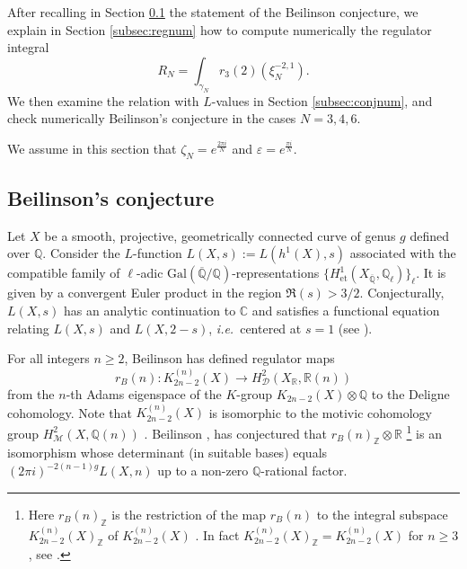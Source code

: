 \documentclass[11pt,a4,leqno]{amsart}
\theoremstyle{my theoremstyle}
\theoremstyle{dfn}
\theoremstyle{remark}
\renewcommand{\1}{\mathbbm{1}}
\newcommand{\Z}{\mathbb{Z}}
\newcommand{\Q}{\mathbb{Q}}
\newcommand{\R}{\mathbb{R}}
\newcommand{\C}{\mathbb{C}}
\newcommand{\e}{\varepsilon}
\newcommand{\z}{\zeta}
\numberwithin{equation}{section}
\begin{document}
After recalling in Section \ref{subsec:beilinson} the statement of the Beilinson conjecture, we explain in Section \ref{subsec:regnum} how to compute numerically the regulator integral
\begin{equation*}
    R_N = \int_{\gamma_N} r_3(2)(\xi_N^{-2,1}).
\end{equation*}
We then examine the relation with $L$-values in Section \ref{subsec:conjnum}, and check numerically Beilinson's conjecture in the cases $N=3,4,6$.

We assume in this section that $\z_N=e^{\frac{2\pi i}{N}}$ and $\e=e^{\frac{\pi i}{N}}$.

\subsection{Beilinson's conjecture} \label{subsec:beilinson}

Let $X$ be a smooth, projective, geometrically connected curve of genus $g$ defined over $\Q$. Consider the $L$-function $L(X,s):=L(h^1(X), s)$ associated with the compatible family of $\ell$-adic $\mathrm{Gal}(\overline{\Q}/\Q)$-representations $\{ H^1_{\mathrm{et}}(X_{\overline{\Q}}, \Q_\ell) \}_\ell$. It is given by a convergent Euler product in the region $\Re(s)> 3/2$. Conjecturally, $L(X,s)$ has an analytic continuation to $\C$ and satisfies a functional equation relating $L(X,s)$ and $L(X,2-s)$, \emph{i.e.}~centered at $s=1$ (see \cite[Section 1]{Nek94}).

For all integers $n \geq 2$, Beilinson \cite{Bei80, Nek94} has defined regulator maps 
\begin{equation}\label{rb(n)}
    r_B(n) \colon K_{2n-2}^{(n)}(X) \longrightarrow H^2_{\mathcal{D}}(X_{\mathbb{R}}, \mathbb{R}(n))
\end{equation}
from the $n$-th Adams eigenspace of the $K$-group $K_{2n-2}(X)\otimes \Q$ to the Deligne cohomology. Note that $K_{2n-2}^{(n)}(X)$ is isomorphic to the motivic cohomology group $H^2_{\mathcal{M}}(X, \Q(n))$ \cite[Section 5.1]{Nek94}.
Beilinson \cite{Bei80}, \cite[(6.1)]{Nek94} has conjectured that $r_B(n)_{\Z}\otimes \R$ \footnote{Here $r_B(n)_\Z$ is the restriction of the map $r_B(n)$ to the integral subspace $K_{2n-2}^{(n)}(X)_{\Z}$ of $K_{2n-2}^{(n)}(X)$ \cite[(6.1)]{Nek94}. In fact $K_{2n-2}^{(n)}(X)_{\Z} = K_{2n-2}^{(n)}(X)$ for $n \geq 3$, see \cite[Remarks 5.6]{DS91}.} is an isomorphism 
whose determinant (in suitable bases) equals $(2\pi i)^{-2(n-1)g} L(X,n)$ up to a non-zero $\Q$-rational factor. 
\end{document}
